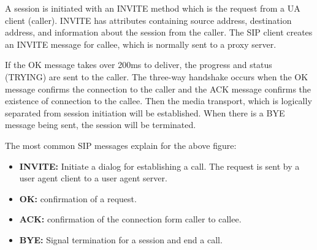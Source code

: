     A session is initiated with an INVITE method which is the request from a UA client (caller). 
    INVITE has attributes containing source address, destination address, and information about the session from the caller. 
    The SIP client creates an INVITE message for callee, which is normally sent to a proxy server.

    \noindent If the OK message takes over 200ms to deliver, the progress and status (TRYING) are sent to the caller. 
    The three-way handshake occurs when the OK message confirms the connection to the caller and the ACK message confirms the existence of connection to the callee. 
    Then the media transport, which is logically separated from session initiation will be established. When there is a BYE message being sent, the session will be terminated. 

    \noindent The most common SIP messages explain for the above figure:
    \begin{itemize}
        \item \textbf {INVITE:} Initiate a dialog for establishing a call. The request is sent by a user agent client to a user agent server.
        \item \textbf {OK:} confirmation of a request.
        \item \textbf {ACK:} confirmation of the connection form caller to callee.
        \item \textbf{BYE:} Signal termination for a session and end a call.
    \end{itemize}


